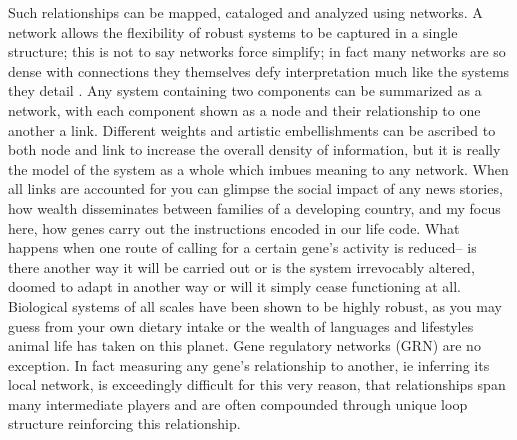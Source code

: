 Such relationships can be mapped, cataloged and analyzed using networks. A network allows the flexibility of robust systems to be captured in a single structure; this is not to say networks force simplify; in fact many networks are so dense with connections they themselves defy interpretation much like the systems they detail \citep{dianati2016unwinding}. Any system containing two components can be summarized as a network, with each component shown as a node and their relationship to one another a link. Different weights and artistic embellishments can be ascribed to both node and link to increase the overall density of information, but it is really the model of the system as a whole which imbues meaning to any network. When all links are accounted for you can glimpse the social impact of any news stories, how wealth disseminates between families of a developing country, and my focus here, how genes carry out the instructions encoded in our life code. What happens when one route of calling for a certain gene's activity is reduced-- is there another way it will be carried out or is the system irrevocably altered, doomed to adapt in another way or will it simply cease functioning at all. Biological systems of all scales have been shown to be highly robust, as you may guess from your own dietary intake or the wealth of languages and lifestyles animal life has taken on this planet. Gene regulatory networks (GRN) are no exception. In fact measuring any gene's relationship to another, ie inferring its local network, is exceedingly difficult for this very reason, that relationships span many intermediate players and are often compounded through unique loop structure reinforcing this relationship.

